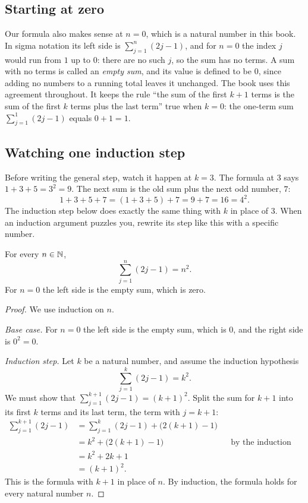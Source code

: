 \subsection*{Starting at zero}
Our formula also makes sense at $n=0$, which is a natural number in this book. In sigma notation its left side is $\sum_{j=1}^{n}(2j-1)$, and for $n=0$ the index $j$ would run from $1$ up to $0$: there are no such $j$, so the sum has no terms. A sum with no terms is called an \emph{empty sum}, and its value is defined to be $0$, since adding no numbers to a running total leaves it unchanged. The book uses this agreement throughout. It keeps the rule ``the sum of the first $k+1$ terms is the sum of the first $k$ terms plus the last term'' true when $k=0$: the one-term sum $\sum_{j=1}^{1}(2j-1)$ equals $0+1=1$.

\subsection*{Watching one induction step}
Before writing the general step, watch it happen at $k=3$. The formula at $3$ says $1+3+5=3^2=9$. The next sum is the old sum plus the next odd number, $7$:
\[
1+3+5+7=(1+3+5)+7=9+7=16=4^2.
\]
The induction step below does exactly the same thing with $k$ in place of $3$. When an induction argument puzzles you, rewrite its step like this with a specific number.

\par\noindent\begin{minipage}{\linewidth}
\begin{theorem}\label{thm:odds}
For every $n\in\mathbb N$,
\[
\sum_{j=1}^{n}(2j-1)=n^2.
\]
For $n=0$ the left side is the empty sum, which is zero.
\end{theorem}
\end{minipage}\par

\begin{proof}
We use induction on $n$.

\emph{Base case.} For $n=0$ the left side is the empty sum, which is $0$, and the right side is $0^2=0$.

\emph{Induction step.} Let $k$ be a natural number, and assume the induction hypothesis
\[
\sum_{j=1}^{k}(2j-1)=k^2.
\]
We must show that $\sum_{j=1}^{k+1}(2j-1)=(k+1)^2$. Split the sum for $k+1$ into its first $k$ terms and its last term, the term with $j=k+1$:
\begin{align*}
\sum_{j=1}^{k+1}(2j-1)
&=\sum_{j=1}^{k}(2j-1)+\bigl(2(k+1)-1\bigr)\\
&=k^2+\bigl(2(k+1)-1\bigr) &&\text{by the induction hypothesis}\\
&=k^2+2k+1\\
&=(k+1)^2.
\end{align*}
This is the formula with $k+1$ in place of $n$. By induction, the formula holds for every natural number $n$.
\end{proof}

